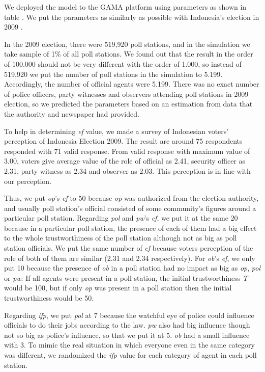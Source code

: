 \documentclass[JIP]{ipsj}
\begin{document}
We deployed the model to the GAMA platform using parameters as shown in table . We put the parameters as similarly as possible with Indonesia's election in 2009 \cite{KPU200903}\cite{PemiluIndonesia20090313}.

In the 2009 election, there were 519,920 poll stations, and in the simulation we take sample of 1\% of all poll stations. We found out that the result in the order of 100.000 should not be very different with the order of 1.000, so instead of 519,920 we put the number of poll stations in the simulation to 5.199. Accordingly, the number of official agents were 5.199. There was no exact number of police officers, party witnesses and observers attending poll stations in 2009 election, so we predicted the parameters based on an estimation from data that the authority and newspaper had provided.

To help in determining \textit{ef} value, we made a survey of Indonesian voters' perception of Indonesia Election 2009\cite{SurveiPersepsiPemilu2009}. The result are around 75 respondents responded with 71 valid response. From valid response with maximum value of 3.00, voters give average value of the role of official as 2.41, security officer as 2.31, party witness as 2.34 and observer as 2.03. This perception is in line with our perception.

Thus, we put \textit{op}'s \textit{ef} to 50 because \textit{op} was authorized from the election authority, and usually poll station's official consisted of some community's figures around a particular poll station. Regarding \textit{pol} and \textit{pw}'s \textit{ef}, we put it at the same 20 because in a particular poll station, the presence of each of them had a big effect to the whole trustworthiness of the poll station although not as big as poll station officials. We put the same number of \textit{ef} because voters perception of the role of both of them are similar (2.31 and 2.34 respectively). For \textit{ob}'s \textit{ef}, we only put 10 because the presence of \textit{ob} in a poll station had no impact as big as \textit{op}, \textit{pol} or \textit{pw}. If all agents were present in a poll station, the initial trustworthiness \textit{T} would be 100, but if only \textit{op} was present in a poll station then the initial trustworthiness would be 50.

Regarding \textit{ifp}, we put \textit{pol} at 7 because the watchful eye of police could influence officials to do their jobs according to the law. \textit{pw} also had big influence though not so big as police's influence, so that we put it at 5. \textit{ob} had a small influence with 3. To mimic the real situation in which everyone even in the same category was different, we randomized the \textit{ifp} value for each category of agent in each poll station.
\end{document}
